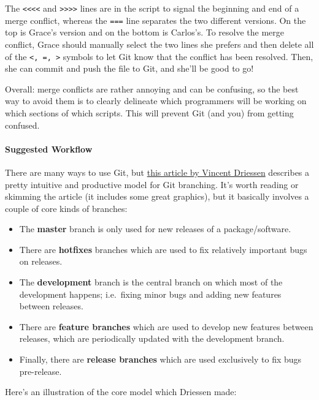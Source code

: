 \documentclass[]{book}
\providecommand{\tightlist}{%
  \setlength{\itemsep}{0pt}\setlength{\parskip}{0pt}}
\let\oldparagraph\paragraph
\renewcommand{\paragraph}[1]{\oldparagraph{#1}\mbox{}}
\begin{document}
The \texttt{\textless{}\textless{}\textless{}\textless{}} and
\texttt{\textgreater{}\textgreater{}\textgreater{}\textgreater{}} lines
are in the script to signal the beginning and end of a merge conflict,
whereas the \texttt{===} line separates the two different versions. On
the top is Grace's version and on the bottom is Carlos's. To resolve the
merge conflict, Grace should manually select the two lines she prefers
and then delete all of the \texttt{\textless{},\ =,\ \textgreater{}}
symbols to let Git know that the conflict has been resolved. Then, she
can commit and push the file to Git, and she'll be good to go!

Overall: merge conflicts are rather annoying and can be confusing, so
the best way to avoid them is to clearly delineate which programmers
will be working on which sections of which scripts. This will prevent
Git (and you) from getting confused.

\paragraph{Suggested Workflow}\label{suggested-workflow}

There are many ways to use Git, but
\href{https://nvie.com/posts/a-successful-git-branching-model/}{this
article by Vincent Driessen} describes a pretty intuitive and productive
model for Git branching. It's worth reading or skimming the article (it
includes some great graphics), but it basically involves a couple of
core kinds of branches:

\begin{itemize}
\tightlist
\item
  The \textbf{master} branch is only used for new releases of a
  package/software.
\item
  There are \textbf{hotfixes} branches which are used to fix relatively
  important bugs on releases.
\item
  The \textbf{development} branch is the central branch on which most of
  the development happens; i.e.~fixing minor bugs and adding new
  features between releases.
\item
  There are \textbf{feature branches} which are used to develop new
  features between releases, which are periodically updated with the
  development branch.
\item
  Finally, there are \textbf{release branches} which are used
  exclusively to fix bugs pre-release.
\end{itemize}

Here's an illustration of the core model which Driessen made:
\end{document}
